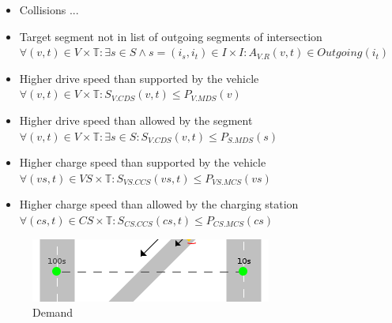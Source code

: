 \documentclass{IEEEtran}
\begin{document}
    \begin{itemize}
        \item Collisions ...
        \item Target segment not in list of outgoing segments of intersection $\forall (v,t) \in V \times \mathbb{T}: \exists s \in S \wedge s = (i_s, i_t) \in I \times I: A_{V.R}(v, t) \in Outgoing(i_t)$
        
        \item Higher drive speed than supported by the vehicle $\forall (v,t) \in V \times \mathbb{T}: S_{V.CDS}(v,t) \leq P_{V.MDS}(v)$
        \item Higher drive speed than allowed by the segment $\forall (v,t) \in V \times \mathbb{T}: \exists s \in S: S_{V.CDS}(v,t) \leq P_{S.MDS}(s)$
        \item Higher charge speed than supported by the vehicle $\forall (vs,t) \in VS \times \mathbb{T}: S_{VS.CCS}(vs,t) \leq P_{VS.MCS}(vs)$
        \item Higher charge speed than allowed by the charging station $\forall (cs,t) \in CS \times \mathbb{T}: S_{CS.CCS}(cs,t) \leq P_{CS.MCS}(cs)$
    \end{itemize}

    \begin{figure}[htbp]
        \centering
        \includegraphics[scale=0.5]{../../concepts/demand.png}
        \caption{Demand}
        \label{fig:demand}
    \end{figure}
\end{document}
